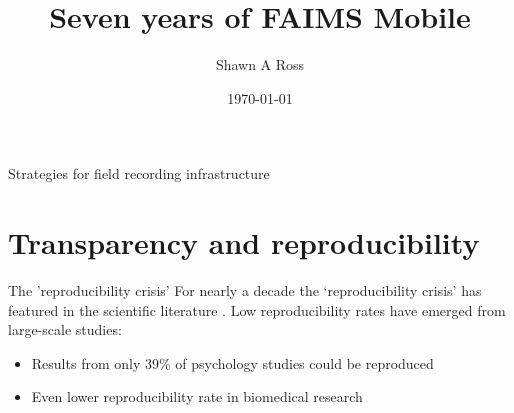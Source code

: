 \documentclass[aspectratio=169, 12pt]{beamer} %
\title{Seven years of FAIMS Mobile} %
\author{Shawn A Ross}               %
\institute{Office of the Deputy Vice-Chancellor (Research)}         %
\date{\today}                 %
\begin{document}

\maketitle

  

\begin{frame}{Strategies for field recording infrastructure}
  \tableofcontents
\end{frame}

%

\section{Transparency and reproducibility}

\begin{frame}{The 'reproducibility crisis'}
  For nearly a decade the ‘reproducibility crisis’ has featured in the scientific literature \cite{Jasny2011-bw, Baker2016-cf, Munafo2017-bj}. Low reproducibility rates have emerged from large-scale studies:
    \begin{itemize}
        \item Results from only 39\% of psychology studies could be reproduced \cite{Open_Science_Collaboration2015-vf}
        \item Even lower reproducibility rate in biomedical research \cite{Begley2012-xt,Prinz2011-za}
    \end{itemize}
\end{frame}

\end{document}

